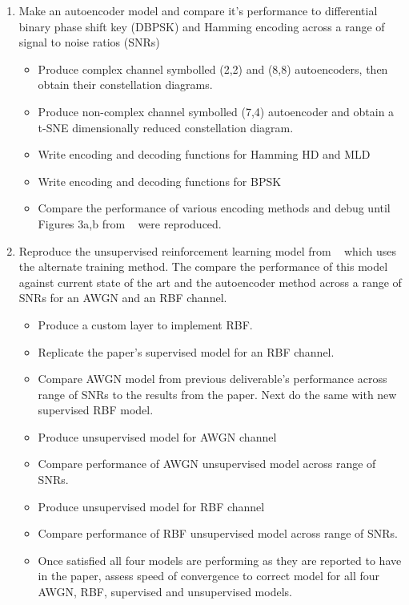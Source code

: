 \documentclass[12pt,onecolumn,letterpaper]{article}
\begin{document}
\begin{enumerate}
   \item Make an autoencoder model and compare it's performance to differential binary phase shift key (DBPSK) and Hamming encoding across a range of signal to noise ratios (SNRs)
   \begin{itemize}
      \item Produce complex channel symbolled (2,2) and (8,8) autoencoders, then obtain their constellation diagrams.
      \item Produce non-complex channel symbolled (7,4) autoencoder and obtain a t-SNE dimensionally reduced constellation diagram.
      \item Write encoding and decoding functions for Hamming HD and MLD
      \item Write encoding and decoding functions for BPSK
      \item Compare the performance of various encoding methods and debug until Figures 3a,b from ~\cite{oShea} were reproduced.
   \end{itemize}
   \item Reproduce the unsupervised reinforcement learning model from ~\cite{Aoudia} which uses the alternate training method. The compare the performance of this model against current state of the art and the autoencoder method across a range of SNRs for an AWGN and an RBF channel.
   \begin{itemize}
      \item Produce a custom layer to implement RBF.
      \item Replicate the paper's supervised model for an RBF channel.
      \item Compare AWGN model from previous deliverable's performance across range of SNRs to the results from the paper. Next do the same with new supervised RBF model.
      \item Produce unsupervised model for AWGN channel
      \item Compare performance of AWGN unsupervised model across range of SNRs.
      \item Produce unsupervised model for RBF channel
      \item Compare performance of RBF unsupervised model across range of SNRs.
      \item Once satisfied all four models are performing as they are reported to have in the paper, assess speed of convergence to correct model for all four AWGN, RBF, supervised and unsupervised models.
   \end{itemize}
\end{enumerate}
\end{document}
